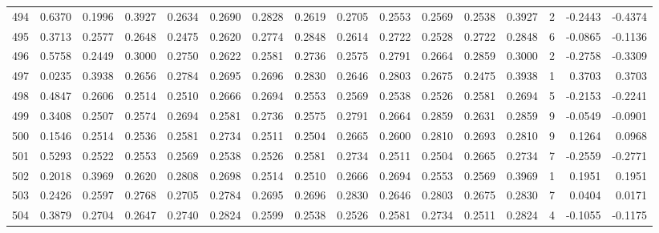 \begin{tabular}{lrrrrrrrrrrrrrrr}
494 &      0.6370 &  0.1996 &  0.3927 &  0.2634 &  0.2690 &  0.2828 &  0.2619 &  0.2705 &  0.2553 &  0.2569 &   0.2538 &     0.3927 &      2 &                   -0.2443 &                    -0.4374 \\
495 &      0.3713 &  0.2577 &  0.2648 &  0.2475 &  0.2620 &  0.2774 &  0.2848 &  0.2614 &  0.2722 &  0.2528 &   0.2722 &     0.2848 &      6 &                   -0.0865 &                    -0.1136 \\
496 &      0.5758 &  0.2449 &  0.3000 &  0.2750 &  0.2622 &  0.2581 &  0.2736 &  0.2575 &  0.2791 &  0.2664 &   0.2859 &     0.3000 &      2 &                   -0.2758 &                    -0.3309 \\
497 &      0.0235 &  0.3938 &  0.2656 &  0.2784 &  0.2695 &  0.2696 &  0.2830 &  0.2646 &  0.2803 &  0.2675 &   0.2475 &     0.3938 &      1 &                    0.3703 &                     0.3703 \\
498 &      0.4847 &  0.2606 &  0.2514 &  0.2510 &  0.2666 &  0.2694 &  0.2553 &  0.2569 &  0.2538 &  0.2526 &   0.2581 &     0.2694 &      5 &                   -0.2153 &                    -0.2241 \\
499 &      0.3408 &  0.2507 &  0.2574 &  0.2694 &  0.2581 &  0.2736 &  0.2575 &  0.2791 &  0.2664 &  0.2859 &   0.2631 &     0.2859 &      9 &                   -0.0549 &                    -0.0901 \\
500 &      0.1546 &  0.2514 &  0.2536 &  0.2581 &  0.2734 &  0.2511 &  0.2504 &  0.2665 &  0.2600 &  0.2810 &   0.2693 &     0.2810 &      9 &                    0.1264 &                     0.0968 \\
501 &      0.5293 &  0.2522 &  0.2553 &  0.2569 &  0.2538 &  0.2526 &  0.2581 &  0.2734 &  0.2511 &  0.2504 &   0.2665 &     0.2734 &      7 &                   -0.2559 &                    -0.2771 \\
502 &      0.2018 &  0.3969 &  0.2620 &  0.2808 &  0.2698 &  0.2514 &  0.2510 &  0.2666 &  0.2694 &  0.2553 &   0.2569 &     0.3969 &      1 &                    0.1951 &                     0.1951 \\
503 &      0.2426 &  0.2597 &  0.2768 &  0.2705 &  0.2784 &  0.2695 &  0.2696 &  0.2830 &  0.2646 &  0.2803 &   0.2675 &     0.2830 &      7 &                    0.0404 &                     0.0171 \\
504 &      0.3879 &  0.2704 &  0.2647 &  0.2740 &  0.2824 &  0.2599 &  0.2538 &  0.2526 &  0.2581 &  0.2734 &   0.2511 &     0.2824 &      4 &                   -0.1055 &                    -0.1175 \\

\end{tabular}
